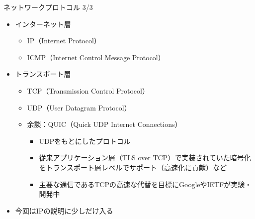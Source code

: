 \documentclass[12pt,aspectratio=169]{beamer}
\begin{document}
\begin{frame}{ネットワークプロトコル 3/3}

  \begin{itemize}
    \item インターネット層
      \begin{itemize}
        \item IP（Internet Protocol）
        \item ICMP（Internet Control Message Protocol）
      \end{itemize}

    \item トランスポート層
      \begin{itemize}
        \item TCP（Transmission Control Protocol）
        \item UDP（User Datagram Protocol）
        \item 余談：QUIC（Quick UDP Internet Connections）
          \begin{itemize}
            \item UDPをもとにしたプロトコル
            \item 従来アプリケーション層（TLS over TCP）で実装されていた暗号化をトランスポート層レベルでサポート（高速化に貢献）など
            \item 主要な通信であるTCPの高速な代替を目標にGoogleやIETFが実験・開発中
          \end{itemize}
      \end{itemize}

    \item { \small 今回はIPの説明に少しだけ入る }

  \end{itemize}

\end{frame}
\end{document}
